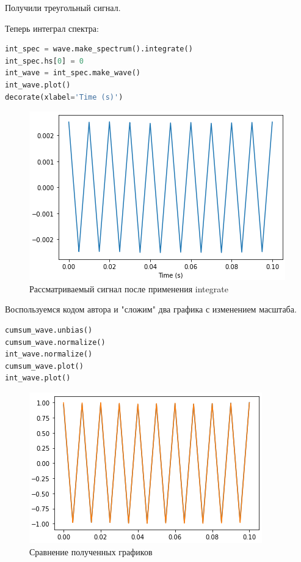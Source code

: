 Получили треугольный сигнал.

Теперь интеграл спектра:

\begin{lstlisting}[language=Python]
int_spec = wave.make_spectrum().integrate()
int_spec.hs[0] = 0
int_wave = int_spec.make_wave()
int_wave.plot()
decorate(xlabel='Time (s)')
\end{lstlisting}
\begin{figure}[H]
	\begin{center}
		\includegraphics[scale=1]{fig/lab09/lab9_6.png}
		\caption{Рассматриваемый сигнал после применения integrate}
	\end{center}
\end{figure}

Воспользуемся кодом автора и "сложим" два графика с изменением масштаба.

\begin{lstlisting}[language=Python]
cumsum_wave.unbias()
cumsum_wave.normalize()
int_wave.normalize()
cumsum_wave.plot()
int_wave.plot()
\end{lstlisting}
\begin{figure}[H]
	\begin{center}
		\includegraphics[scale=1]{fig/lab09/lab9_7.png}
		\caption{Сравнение полученных графиков}
	\end{center}
\end{figure}

